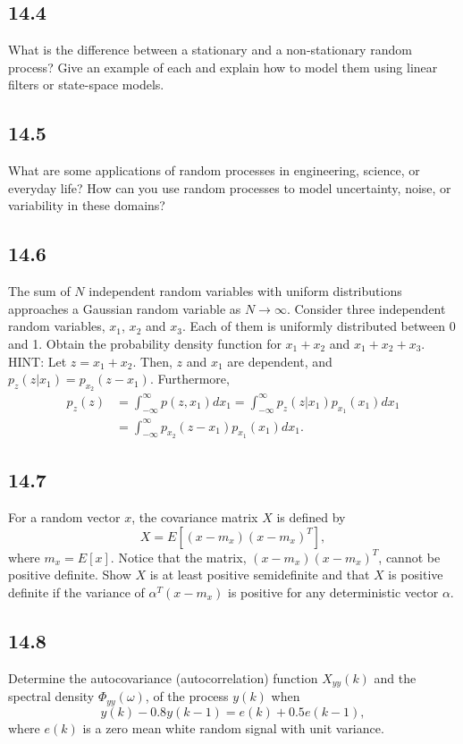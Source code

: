 \documentclass{article}
\newcommand{\problem}[2]{\subsection*{#1}}
\begin{document}
\problem{14.4}{random-process-concepts}
What is the difference between a stationary and a non-stationary random process? Give an example of each and explain how to model them using linear filters or state-space models.

\problem{14.5}{random-process-concepts}
What are some applications of random processes in engineering, science, or everyday life? How can you use random processes to model uncertainty, noise, or variability in these domains?

\problem{14.6}{}
The sum of $N$ independent random variables with uniform distributions approaches a Gaussian random variable as $N \to \infty$. Consider three independent random variables, $x_1$, $x_2$ and $x_3$. Each of them is uniformly distributed between 0 and 1. Obtain the probability density function for $x_1 + x_2$ and $x_1 + x_2 + x_3$. HINT: Let $z = x_1 + x_2$. Then, $z$ and $x_1$ are dependent, and $p_z(z|x_1) = p_{x_2}(z - x_1)$. Furthermore,
\[
\begin{aligned}
p_z(z) &= \int_{-\infty}^{\infty} p(z, x_1)dx_1 = \int_{-\infty}^{\infty} p_z(z|x_1)p_{x_1}(x_1)dx_1 \\
&= \int_{-\infty}^{\infty} p_{x_2}(z - x_1)p_{x_1}(x_1)dx_1.
\end{aligned}
\]

\problem{14.7}{}
For a random vector $x$, the covariance matrix $X$ is defined by
\[
X = E[(x - m_x)(x - m_x)^T],
\]
where $m_x = E[x]$. Notice that the matrix, $(x - m_x)(x - m_x)^T$, cannot be positive definite. Show $X$ is at least positive semidefinite and that $X$ is positive definite if the variance of $\alpha^T(x - m_x)$ is positive for any deterministic vector $\alpha$.

\problem{14.8}{}
Determine the autocovariance (autocorrelation) function $X_{yy}(k)$ and the spectral density $\Phi_{yy}(\omega)$, of the process $y(k)$ when
\[
y(k) - 0.8y(k - 1) = e(k) + 0.5e(k - 1),
\]
where $e(k)$ is a zero mean white random signal with unit variance.
\end{document}

